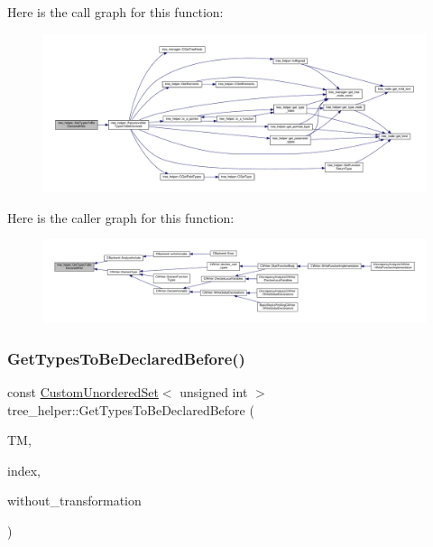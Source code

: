 Here is the call graph for this function\+:
\nopagebreak
\begin{figure}[H]
\begin{center}
\leavevmode
\includegraphics[width=350pt]{d7/d99/classtree__helper_af7f5272cbd83bc074170b7ef3a0e9d5f_cgraph}
\end{center}
\end{figure}
Here is the caller graph for this function\+:
\nopagebreak
\begin{figure}[H]
\begin{center}
\leavevmode
\includegraphics[width=350pt]{d7/d99/classtree__helper_af7f5272cbd83bc074170b7ef3a0e9d5f_icgraph}
\end{center}
\end{figure}
\mbox{\label{classtree__helper_ad23c0a143e197b4b7c07036d975d1355}} 
\subsubsection{\texorpdfstring{Get\+Types\+To\+Be\+Declared\+Before()}{GetTypesToBeDeclaredBefore()}}
{\footnotesize\ttfamily const \hyperlink{classCustomUnorderedSet}{Custom\+Unordered\+Set}$<$ unsigned int $>$ tree\+\_\+helper\+::\+Get\+Types\+To\+Be\+Declared\+Before (\begin{DoxyParamCaption}\item[{const \hyperlink{tree__manager_8hpp_a792e3f1f892d7d997a8d8a4a12e39346}{tree\+\_\+manager\+Const\+Ref}}]{TM,  }\item[{const unsigned int}]{index,  }\item[{const bool}]{without\+\_\+transformation }\end{DoxyParamCaption})\hspace{0.3cm}{\ttfamily [static]}}



